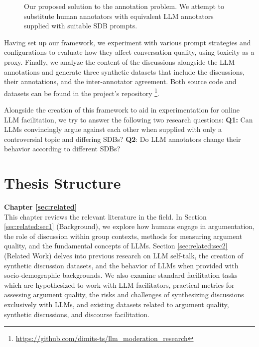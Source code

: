 \begin{figure}
	\centering
	
	\caption{Our proposed solution to the annotation problem. We attempt to substitute human annotators with equivalent LLM annotators supplied with suitable \ac{SDB} prompts.}
	\label{fig::goals_4}
\end{figure}


Having set up our framework, we experiment with various prompt strategies and configurations to evaluate how they affect conversation quality, using toxicity as a proxy. Finally, we analyze the content of the discussions alongside the LLM annotations and generate three synthetic datasets that include the discussions, their annotations, and the inter-annotator agreement. Both source code and datasets can be found in the project's repository \footnote{\url{https://github.com/dimits-ts/llm_moderation_research}}.

Alongside the creation of this framework to aid in experimentation for online LLM facilitation, we try to answer the following two research questions: \textbf{Q1:} Can LLMs convincingly argue against each other when supplied with only a controversial topic and differing \acp{SDB}? \textbf{Q2}: Do LLM annotators change their behavior according to different \acp{SDB}?

\section{Thesis Structure}
\label{sec:intro:structure}

\textbf{Chapter \ref{sec:related}} \\[0.2em]

This chapter reviews the relevant literature in the field. In Section \ref{sec:related:sec1} (Background), we explore how humans engage in argumentation, the role of discussion within group contexts, methods for measuring argument quality, and the fundamental concepts of \acp{LLM}. Section \ref{sec:related:sec2} (Related Work) delves into previous research on LLM self-talk, the creation of synthetic discussion datasets, and the behavior of LLMs when provided with socio-demographic backgrounds. We also examine standard facilitation tasks which are hypothesized to work with LLM facilitators, practical metrics for assessing argument quality, the risks and challenges of synthesizing discussions exclusively with LLMs, and existing datasets related to argument quality, synthetic discussions, and discourse facilitation.


